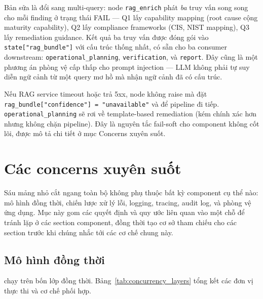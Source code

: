 Bản sửa là đổi sang multi-query: node \texttt{rag\_enrich} phát \emph{ba} truy vấn song song cho mỗi finding ở trạng thái FAIL — Q1 lấy capability mapping (root cause cộng maturity capability), Q2 lấy compliance frameworks (CIS, NIST mapping), Q3 lấy remediation guidance. Kết quả ba truy vấn được đóng gói vào \texttt{state["rag\_bundle"]} với cấu trúc thống nhất, có sẵn cho ba consumer downstream: \texttt{operational\_planning}, \texttt{verification}, và \texttt{report}. Đây cũng là một phương án phòng vệ cấp thấp cho prompt injection — LLM không phải tự suy diễn ngữ cảnh từ một query mơ hồ mà nhận ngữ cảnh đã có cấu trúc.

Nếu RAG service timeout hoặc trả 5xx, node không raise mà đặt \texttt{rag\_bundle["confidence"] = "unavailable"} và để pipeline đi tiếp. \texttt{operational\_planning} sẽ rơi về template-based remediation (kém chính xác hơn nhưng không chặn pipeline). Đây là nguyên tắc fail-soft cho component không cốt lõi, được mô tả chi tiết ở mục Concerns xuyên suốt.


\section{Các concerns xuyên suốt}
\label{sec:cross_cutting}

Sáu mảng nhỏ cắt ngang toàn bộ \sysnameshort{} không phụ thuộc bất kỳ component cụ thể nào: mô hình đồng thời, chiến lược xử lý lỗi, logging, tracing, audit log, và phòng vệ ứng dụng. Mục này gom các quyết định và quy ước liên quan vào một chỗ để tránh lặp ở các section component, đồng thời tạo cơ sở tham chiếu cho các section trước khi chúng nhắc tới các cơ chế chung này.

\subsection{Mô hình đồng thời}
\label{sub:concurrency}

\sysnameshort{} chạy trên bốn lớp đồng thời. Bảng~\ref{tab:concurrency_layers} tổng kết các đơn vị thực thi và cơ chế phối hợp.

